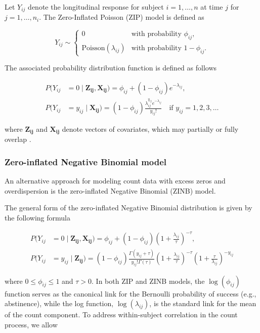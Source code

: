\documentclass[twoside]{article}
\begin{document}
Let \( Y_{ij} \) denote the longitudinal response for subject \( i = 1, \ldots, n \) at time \( j \) for \( j = 1, \ldots, n_i \). The Zero-Inflated Poisson (ZIP) model is defined as

\[
Y_{ij} \sim \begin{cases} 
0 & \text{with probability } \phi_{ij}, \\
\text{Poisson}(\lambda_{ij}) & \text{with probability } 1 - \phi_{ij}.
\end{cases}
\]

The associated probability distribution function is defined as follows

\begin{align*}
P(Y_{ij} &= 0 \mid \bm{Z_{ij}}, \bm{X_{ij}}) = \phi_{ij} + (1 - \phi_{ij})e^{-\lambda_{ij}},\\
P(Y_{ij} &= y_{ij} \mid \bm{X_{ij}}) = (1 - \phi_{ij}) \frac{\lambda_{ij}^{y_{ij}} e^{-\lambda_{ij}}}{y_{ij}!} \quad \text{if } y_{ij} = 1, 2, 3, \ldots
\end{align*}

where \( \bm{Z_{ij}} \) and \( \bm{X_{ij}} \) denote vectors of covariates, which may partially or fully overlap \cite{Zhu:2018}.

\subsubsection{Zero-inflated Negative Binomial model}

An alternative approach for modeling count data with excess zeros and overdispersion is the zero-inflated Negative Binomial (ZINB) model.

The general form of the zero-inflated Negative Binomial distribution is given by the following formula  

\begin{align*}
P(Y_{ij} &= 0 \mid \bm{Z_{ij}}, \bm{X_{ij}}) = \phi_{ij} + (1 - \phi_{ij}) \left(1 + \frac{\lambda_{ij}}{\tau}\right)^{-\tau},\\
P(Y_{ij} &= y_{ij} \mid \bm{Z_{ij}}) = (1 - \phi_{ij}) \frac{\Gamma(y_{ij} + \tau)}{y_{ij}! \Gamma(\tau)}\left(1 + \frac{\lambda_{ij}}{\tau}\right)^{-\tau}\left(1 + \frac{\tau}{\lambda_{ij}}\right)^{-y_{ij}}
\end{align*}


where \( 0 \leq \phi_{ij} \leq 1 \) and \( \tau > 0 \). In both ZIP and ZINB models, the \( \log(\phi_{ij}) \) function serves as the canonical link for the Bernoulli probability of success (e.g., abstinence), while the log function, \( \log(\lambda_{ij}) \), is the standard link for the mean of the count component. To address within-subject correlation in the count process, we allow
\end{document}

